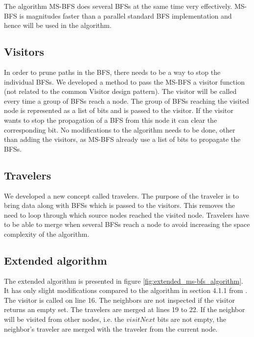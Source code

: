 The algorithm MS-BFS \cite{msbfs} does several BFSs at the same time very effectively. MS-BFS is magnitudes faster than a parallel standard BFS implementation and hence will be used in the algorithm. 

\subsection{Visitors}
In order to prune paths in the BFS, there needs to be a way to stop the individual BFSs. We developed a method to pass the MS-BFS a visitor function (not related to the common Visitor design pattern). The visitor will be called every time a group of BFSs reach a node. The group of BFSs reaching the visited node is represented as a list of bits and is passed to the visitor. If the visitor wants to stop the propagation of a BFS from this node it can clear the corresponding bit. No modifications to the algorithm needs to be done, other than adding the visitors, as MS-BFS already use a list of bits to propagate the BFSs.

\subsection{Travelers}
We developed a new concept called travelers. The purpose of the traveler is to bring data along with BFSs which is passed to the visitors. This removes the need to loop through which source nodes reached the visited node. Travelers have to be able to merge when several BFSs reach a node to avoid increasing the space complexity of the algorithm. 

\subsection{Extended algorithm}

The extended algorithm is presented in figure \ref{fig:extended_ms-bfs_algorithm}. It has only slight modifications compared to the algorithm in section 4.1.1 from \cite{msbfs}. The visitor is called on line 16. The neighbors are not inspected if the visitor returns an empty set. The travelers are merged at lines 19 to 22. If the neighbor will be visited from other nodes, i.e. the $visitNext$ bits are not empty, the neighbor's traveler are merged with the traveler from the current node.

